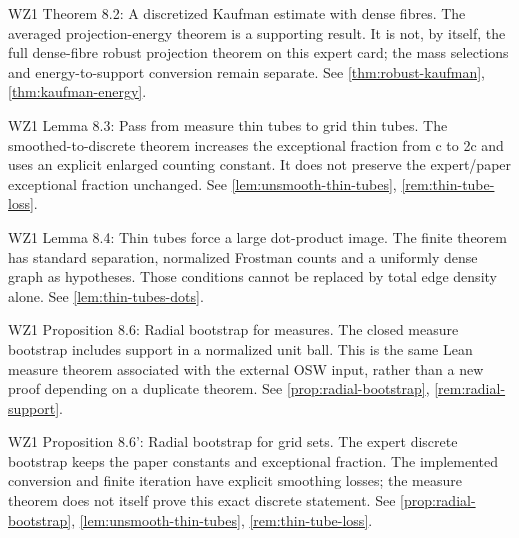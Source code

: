 \begin{remark}
\label{rem:atlas-T8_2}
WZ1 Theorem 8.2: A discretized Kaufman estimate with dense fibres.
The averaged projection-energy theorem is a supporting result. It is not, by itself, the full dense-fibre robust projection theorem on this expert card; the mass selections and energy-to-support conversion remain separate.
See \ref{thm:robust-kaufman}, \ref{thm:kaufman-energy}.
\end{remark}

\begin{remark}
\label{rem:atlas-L8_3}
WZ1 Lemma 8.3: Pass from measure thin tubes to grid thin tubes.
The smoothed-to-discrete theorem increases the exceptional fraction from c to 2c and uses an explicit enlarged counting constant. It does not preserve the expert/paper exceptional fraction unchanged.
See \ref{lem:unsmooth-thin-tubes}, \ref{rem:thin-tube-loss}.
\end{remark}

\begin{remark}
\label{rem:atlas-L8_4}
WZ1 Lemma 8.4: Thin tubes force a large dot-product image.
The finite theorem has standard separation, normalized Frostman counts and a uniformly dense graph as hypotheses. Those conditions cannot be replaced by total edge density alone.
See \ref{lem:thin-tubes-dots}.
\end{remark}

\begin{remark}
\label{rem:atlas-P8_6}
WZ1 Proposition 8.6: Radial bootstrap for measures.
The closed measure bootstrap includes support in a normalized unit ball. This is the same Lean measure theorem associated with the external OSW input, rather than a new proof depending on a duplicate theorem.
See \ref{prop:radial-bootstrap}, \ref{rem:radial-support}.
\end{remark}

\begin{remark}
\label{rem:atlas-P8_6p}
WZ1 Proposition 8.6': Radial bootstrap for grid sets.
The expert discrete bootstrap keeps the paper constants and exceptional fraction. The implemented conversion and finite iteration have explicit smoothing losses; the measure theorem does not itself prove this exact discrete statement.
See \ref{prop:radial-bootstrap}, \ref{lem:unsmooth-thin-tubes}, \ref{rem:thin-tube-loss}.
\end{remark}

